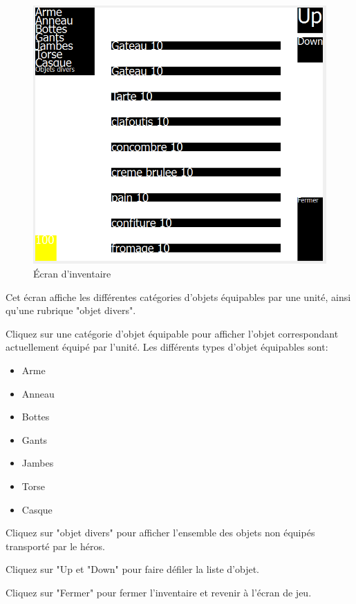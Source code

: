 \documentclass[11pt,a4paper]{article}
\begin{document}
\begin{figure}[h]
\begin{center}
\includegraphics[scale=0.5]{./ecran_inventaire.png}
\caption{Écran d'inventaire}
\end{center}
\end{figure}

Cet écran affiche les différentes catégories d'objets équipables par une unité, ainsi qu'une rubrique "objet divers".

Cliquez sur une catégorie d'objet équipable pour afficher l'objet correspondant actuellement équipé par l'unité.
Les différents types d'objet équipables sont:
\begin{itemize}
\item Arme
\item Anneau
\item Bottes
\item Gants
\item Jambes
\item Torse
\item Casque
\end{itemize}

Cliquez sur "objet divers" pour afficher l'ensemble des objets non équipés transporté par le héros.

Cliquez sur "Up et "Down" pour faire défiler la liste d'objet.

Cliquez sur "Fermer" pour fermer l'inventaire et revenir à l'écran de jeu.
\end{document}
